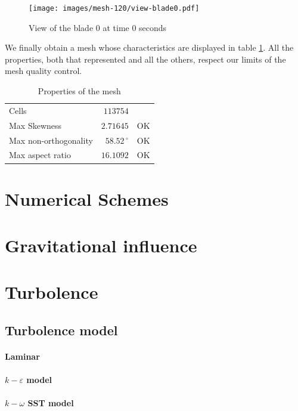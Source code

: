 \documentclass[a4paper,12pt]{article}
\begin{document}
\begin{figure}[H]
\centering
\texttt{[image: images/mesh-120/view-blade0.pdf]}
\caption{View of the blade 0 at time 0 seconds}
\end{figure}

We finally obtain a mesh whose characteristics are displayed in table \ref{table:mesh120}. All the properties, both that represented and all the others, respect our limits of the mesh quality control. 
\begin{table}[H]
\centering
\caption{Properties of the mesh}
\label{table:mesh120}
\begin{tabular}{lr|c}
\toprule
Cells                 & $113754$     &    \\
Max Skewness          & $2.71645$    & OK \\
Max non-orthogonality & $58.52\,^{\circ}$ & OK \\
Max aspect ratio      & $16.1092$    & OK \\ \bottomrule
\end{tabular}
\end{table} 

\section{Numerical Schemes}

\section{Gravitational influence}

\section{Turbolence}

\subsection{Turbolence model}

\paragraph{Laminar}

\paragraph{$k-\varepsilon$ model}

\paragraph{$k-\omega $ SST model}
\end{document}
